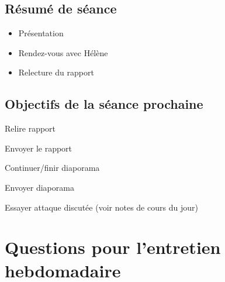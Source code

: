 \documentclass[12pt]{article}
\newcommand{\cmark}{\ding{51}}%
\newcommand{\done}{\rlap{$\square$}{\raisebox{2pt}{\large\hspace{1pt}\cmark}}%
	\hspace{-2.5pt}}
\begin{document}
	\subsection{Résumé de séance}
	\begin{itemize}
		\item Présentation
		\item Rendez-vous avec Hélène
		\item Relecture du rapport
	\end{itemize}
	
	\subsection{Objectifs de la séance prochaine}
	\begin{todolist}
		\item[\done] Relire rapport
		\item Envoyer le rapport
		\item Continuer/finir diaporama
		\item Envoyer diaporama
		\item Essayer attaque discutée (voir notes de cours du jour)
	\end{todolist}
	
	
	\section{Questions pour l'entretien hebdomadaire}
\end{document}
